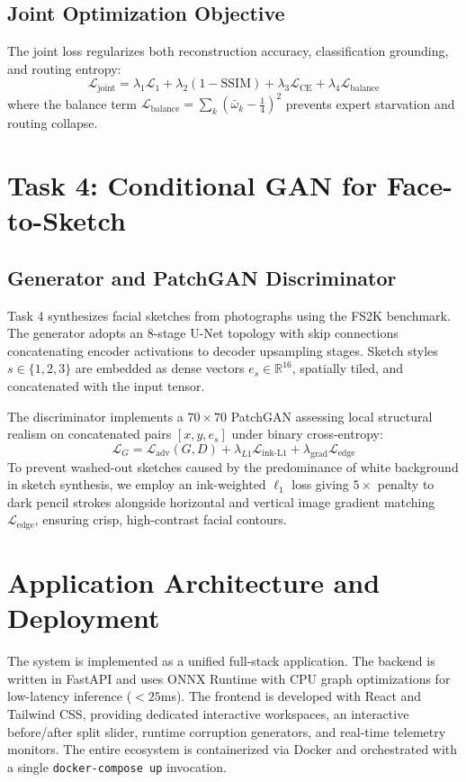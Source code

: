 \documentclass[conference]{IEEEtran}
\begin{document}
\subsection{Joint Optimization Objective}
The joint loss regularizes both reconstruction accuracy, classification grounding, and routing entropy:
\begin{equation}
\mathcal{L}_{\text{joint}} = \lambda_1 \mathcal{L}_1 + \lambda_2 (1-\text{SSIM}) + \lambda_3 \mathcal{L}_{\text{CE}} + \lambda_4 \mathcal{L}_{\text{balance}}
\end{equation}
where the balance term $\mathcal{L}_{\text{balance}} = \sum_k (\bar{\omega}_k - \frac{1}{4})^2$ prevents expert starvation and routing collapse.

\section{Task 4: Conditional GAN for Face-to-Sketch}
\subsection{Generator and PatchGAN Discriminator}
Task 4 synthesizes facial sketches from photographs using the FS2K benchmark. The generator adopts an 8-stage U-Net topology with skip connections concatenating encoder activations to decoder upsampling stages. Sketch styles $s \in \{1, 2, 3\}$ are embedded as dense vectors $e_s \in \mathbb{R}^{16}$, spatially tiled, and concatenated with the input tensor.

The discriminator implements a $70 \times 70$ PatchGAN assessing local structural realism on concatenated pairs $[x, y, e_s]$ under binary cross-entropy:
\begin{equation}
\mathcal{L}_G = \mathcal{L}_{\text{adv}}(G, D) + \lambda_{L1} \mathcal{L}_{\text{ink-L1}} + \lambda_{\text{grad}} \mathcal{L}_{\text{edge}}
\end{equation}
To prevent washed-out sketches caused by the predominance of white background in sketch synthesis, we employ an ink-weighted $\ell_1$ loss giving $5\times$ penalty to dark pencil strokes alongside horizontal and vertical image gradient matching $\mathcal{L}_{\text{edge}}$, ensuring crisp, high-contrast facial contours.

\section{Application Architecture and Deployment}
The system is implemented as a unified full-stack application. The backend is written in FastAPI and uses ONNX Runtime with CPU graph optimizations for low-latency inference ($<25$ms). The frontend is developed with React and Tailwind CSS, providing dedicated interactive workspaces, an interactive before/after split slider, runtime corruption generators, and real-time telemetry monitors. The entire ecosystem is containerized via Docker and orchestrated with a single \texttt{docker-compose up} invocation.
\end{document}
